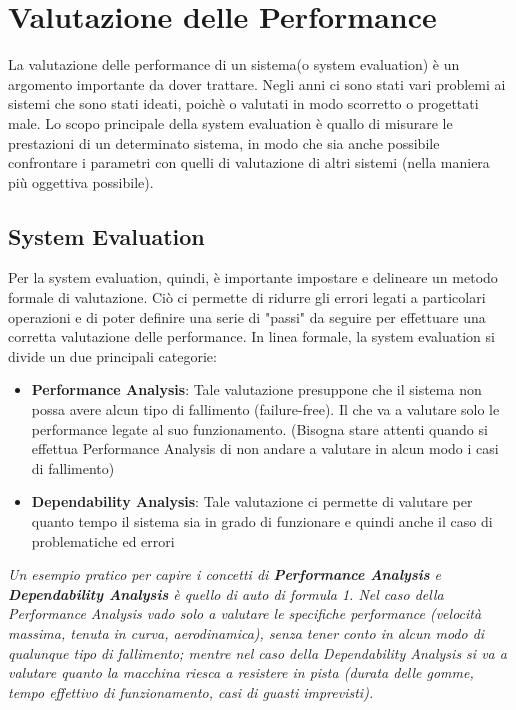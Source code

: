 \chapter{Valutazione delle Performance}
La valutazione delle performance di un sistema(o system evaluation) è un argomento importante da dover trattare. Negli anni ci sono stati vari problemi ai sistemi che sono stati ideati, poichè o valutati in modo scorretto o progettati male. Lo scopo principale della system evaluation è quallo di misurare le prestazioni di un determinato sistema, in modo che sia anche possibile confrontare i parametri con quelli di valutazione di altri sistemi (nella maniera più oggettiva possibile).

\section{System Evaluation}
Per la system evaluation, quindi, è importante impostare e delineare un metodo formale di valutazione. Ciò ci permette di ridurre gli errori legati a particolari operazioni e di poter definire una serie di "passi" da seguire per effettuare una corretta valutazione delle performance.
In linea formale, la system evaluation si divide un due principali categorie:
\begin{itemize}
    \item \textbf{Performance Analysis}: Tale valutazione presuppone che il sistema non possa avere alcun tipo di fallimento (failure-free). Il che va a valutare solo le performance legate al suo funzionamento. (Bisogna stare attenti quando si effettua Performance Analysis di non andare a valutare in alcun modo i casi di fallimento)
    
    \item \textbf{Dependability Analysis}: Tale valutazione ci permette di valutare per quanto tempo il sistema sia in grado di funzionare e quindi anche il caso di problematiche ed errori
\end{itemize}

\textit{Un esempio pratico per capire i concetti di \textbf{Performance Analysis} e \textbf{Dependability Analysis} è quello di auto di formula 1. Nel caso della Performance Analysis vado solo a valutare le specifiche performance (velocità massima, tenuta in curva, aerodinamica), senza tener conto in alcun modo di qualunque tipo di fallimento; mentre nel caso della Dependability Analysis si va a valutare quanto la macchina riesca a resistere in pista (durata delle gomme, tempo effettivo di funzionamento, casi di guasti imprevisti).
}

